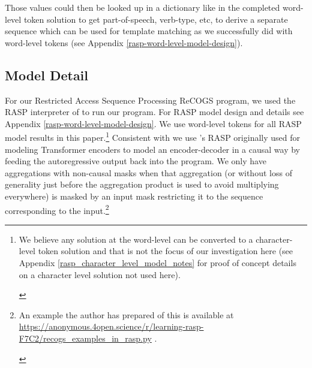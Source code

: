 \documentclass[11pt]{article}
\begin{document}
Those values could then be looked up in a dictionary like in the completed word-level token solution to get part-of-speech, verb-type, etc, to derive a separate sequence which can be used for template matching as we successfully did with word-level tokens (see Appendix \ref{rasp-word-level-model-design}).

\clearpage
\subsection{Model Detail}
\label{model_detail}

For our Restricted Access Sequence Processing ReCOGS program, we used the RASP interpreter of \cite{Weiss2021} to run our program. For RASP model design and details see Appendix \ref{rasp-word-level-model-design}. We use word-level tokens for all RASP model results in this paper.\footnote{\begin{footnotesize}We believe any solution at the word-level can be converted to a character-level token solution and that is not the focus of our investigation here (see Appendix \ref{rasp_character_level_model_notes} for proof of concept details on a character level solution not used here).\end{footnotesize}}
Consistent with \cite{Zhou2024} we use \cite{Weiss2021}'s RASP originally used for modeling Transformer encoders to model an encoder-decoder in a causal way by feeding the autoregressive output back into the program. We only have aggregations with non-causal masks when that aggregation (or without loss of generality just before the aggregation product is used to avoid multiplying everywhere) is masked by an input mask restricting it to the sequence corresponding to the input.\footnote{\begin{footnotesize}An example the author has prepared of this is available at 
\href{https://anonymous.4open.science/r/learning-rasp-F7C2/recogs_examples_in_rasp.py}{https://anonymous.4open.science/r/learning-rasp-F7C2/recogs\_examples\_in\_rasp.py} .\end{footnotesize}}
\end{document}
